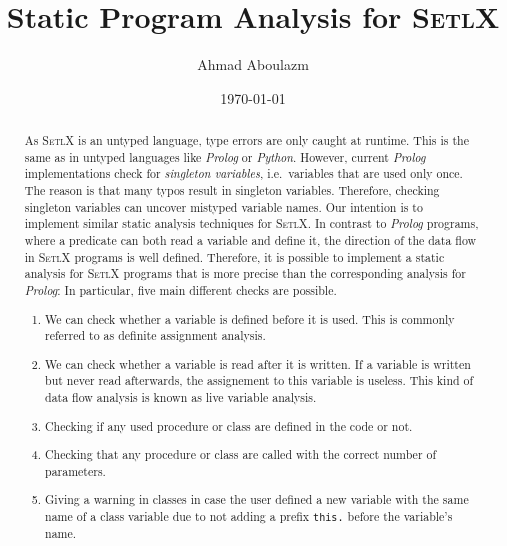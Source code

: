 \documentclass[11pt]{report}
\begin{document}
\begin{Huge}
\title{Static Program Analysis for \textsc{SetlX}}
\author{Ahmad Aboulazm}
\date{\today}
\maketitle
\end{Huge}
\pagebreak
\tableofcontents
\pagebreak


\begin{abstract}
As \textsc{SetlX} is an untyped language, type errors are only caught at runtime.  This is the same
as in untyped languages like \textsl{Prolog} or \textsl{Python}.  However, current \textsl{Prolog}
implementations check for \emph{singleton variables}, i.e.~variables that are used only once.  The
reason is that many typos result in singleton variables.  Therefore, checking singleton variables
can uncover mistyped variable names.  Our intention 
is to implement similar static analysis techniques for \textsc{SetlX}.  In contrast to
\textsl{Prolog} programs, where a predicate can both read a variable and define it, the direction of
the data flow in \textsc{SetlX} programs is well defined.  Therefore, it is possible to implement a
static analysis for \textsc{SetlX} programs that is more precise than the corresponding analysis for
\textsl{Prolog}:  In particular, five main different checks are possible.

\begin{enumerate}
\item We can check whether a variable is defined before it is used.
      This is commonly referred to as definite assignment analysis.
\item We can check whether a variable is read after it is written.  If a variable is written but
      never read afterwards, the assignement to this variable is useless.  This kind of data flow
      analysis is known as live variable analysis.
\item Checking if any used procedure or class are defined in the code or not.
\item Checking that any procedure or class are called with the correct number of parameters.
\item Giving a warning in classes in case the user defined a new variable with the same name of a class variable due to not adding a prefix \texttt{this.} before the variable's name.
\end{enumerate}
\end{abstract}
\end{document}
